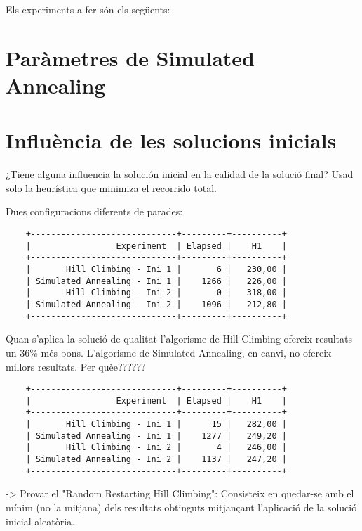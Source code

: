
Els experiments a fer són els següents:

\section{Paràmetres de Simulated Annealing} %
\label{sec:expSA}


\section{Influència de les solucions inicials} %
\label{sec:expsolini}

	¿Tiene alguna influencia la solución inicial en la calidad de la solució final? Usad solo
	la heurística que minimiza el recorrido total.

Dues configuracions diferents de parades:

\begin{verbatim}
	+-----------------------------+---------+----------+
	|                 Experiment  | Elapsed |    H1    |
	+-----------------------------+---------+----------+
	|       Hill Climbing - Ini 1 |       6 |   230,00 |
	| Simulated Annealing - Ini 1 |    1266 |   226,00 |
	|       Hill Climbing - Ini 2 |       0 |   318,00 |
	| Simulated Annealing - Ini 2 |    1096 |   212,80 |
	+-----------------------------+---------+----------+
\end{verbatim}
	
	Quan s'aplica la solució de qualitat l'algorisme de Hill Climbing ofereix resultats un 36\% més bons. L'algorisme de Simulated Annealing, en canvi, no ofereix millors resultats. Per quèe??????
	
\begin{verbatim}
	+-----------------------------+---------+----------+
	|                 Experiment  | Elapsed |    H1    |
	+-----------------------------+---------+----------+
	|       Hill Climbing - Ini 1 |      15 |   282,00 |
	| Simulated Annealing - Ini 1 |    1277 |   249,20 |
	|       Hill Climbing - Ini 2 |       4 |   246,00 |
	| Simulated Annealing - Ini 2 |    1137 |   247,20 |
	+-----------------------------+---------+----------+
\end{verbatim}	
	
	-> Provar el "Random Restarting Hill Climbing": Consisteix en quedar-se amb el mínim (no la mitjana) dels resultats obtinguts mitjançant l'aplicació de la solució inicial aleatòria.
	
